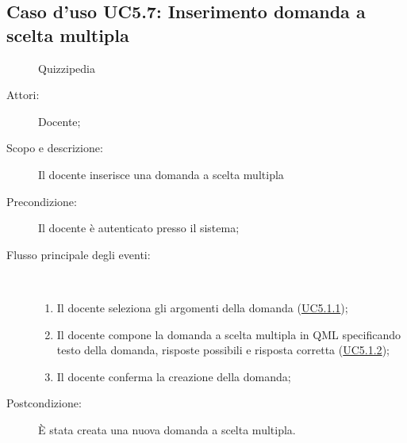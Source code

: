 \subsection{Caso d'uso UC5.7: Inserimento domanda a scelta multipla}
	\begin{figure}[H]
		\centering
		\begin{resizedtikzpicture}{\textwidth}
		\begin{umlsystem}[x=0, fill=lightgray!20]{Quizzipedia}
		\end{umlsystem}
		\end{resizedtikzpicture}
		\caption{}
	\end{figure}
\begin{description}
\item[Attori:] Docente;
\item[Scopo e descrizione:] Il docente inserisce una domanda a scelta multipla
      \item[Precondizione:] Il docente è autenticato presso il sistema;

        \item[Flusso principale degli eventi:] \ 
 \begin{enumerate}
          \item Il docente seleziona gli argomenti della domanda (\hyperlink{UC5.1.1}{UC5.1.1});
          \item Il docente compone la domanda a scelta multipla in QML specificando testo della domanda, risposte possibili e risposta corretta (\hyperlink{UC5.1.2}{UC5.1.2});
          \item Il docente conferma la creazione della domanda;

      \end{enumerate}
    \item[Postcondizione:] È stata creata una nuova domanda a scelta multipla.
  \end{description}
\hypertarget{UC5.8}{}
